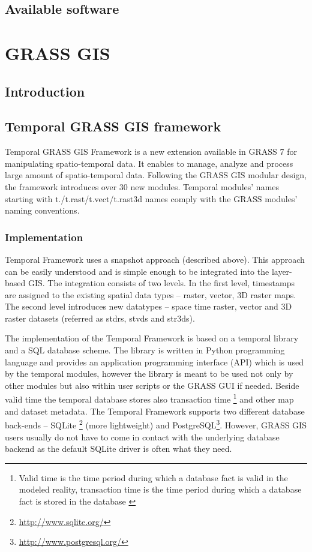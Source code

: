 \documentclass[a4paper,12pt]{book}
\newcommand{\tf}{Temporal Framework\xspace}
\begin{document}




\section{Available software}

\chapter{GRASS GIS}

\section{Introduction}
\section{Temporal GRASS GIS framework}
Temporal GRASS GIS Framework is a new extension available in GRASS 7 for manipulating spatio-temporal data.
It enables to manage, analyze and process large amount of spatio-temporal data.
Following the GRASS GIS modular design, the framework introduces over 30 new modules.
Temporal modules' names starting with t./t.rast/t.vect/t.rast3d names
comply with the GRASS modules' naming conventions.

\subsection{Implementation}
\tf uses a snapshot approach (described above).
This approach can be easily understood and is simple enough to be integrated into the layer-based GIS.
The integration consists of two levels.
In the first level, timestamps are assigned to the existing spatial data types -- raster, vector, 3D raster maps.
The second level introduces new datatypes -- space time raster,
vector and 3D raster datasets (referred as stdrs, stvds and str3ds).

The implementation of the \tf is based on a temporal library and a SQL database scheme.
The library is written in Python programming language and provides an application programming interface (API) which is used by the temporal modules,
however the library is meant to be used not only by other modules but also within user scripts or the GRASS GUI if needed.
Beside valid time the temporal database stores also transaction time%
\footnote{Valid time is the time period during which a database fact is valid in the modeled reality,
transaction time  is the time period during which a database fact is stored in the database \cite{temporalGlossary}}
and other map and dataset metadata.
The \tf supports two different database back-ends -- SQLite%
\footnote{\url{http://www.sqlite.org/}} (more lightweight) and
PostgreSQL\footnote{\url{http://www.postgresql.org/}}.
However, GRASS GIS users usually do not have to come in contact with the underlying database backend
as the default SQLite driver is often what they need.
\end{document}
